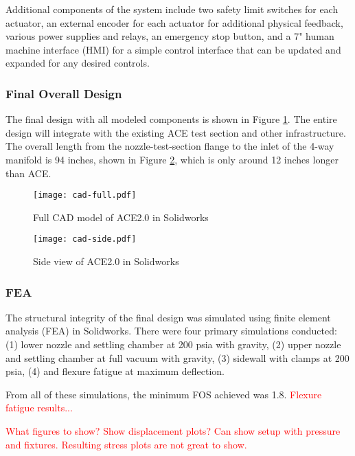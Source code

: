Additional components of the system include two safety limit switches for each actuator, an external encoder for each actuator for additional physical feedback, various power supplies and relays, an emergency stop button, and a 7" human machine interface (HMI) for a simple control interface that can be updated and expanded for any desired controls.

\subsubsection{Final Overall Design}

The final design with all modeled components is shown in Figure \ref{fig:cad-full}. The entire design will integrate with the existing ACE test section and other infrastructure. The overall length from the nozzle-test-section flange to the inlet of the 4-way manifold is 94 inches, shown in Figure \ref{fig:cad-side}, which is only around 12 inches longer than ACE.

\begin{figure}[ht!]
    \centering
    \texttt{[image: cad-full.pdf]}
    \caption{Full CAD model of ACE2.0 in Solidworks}
    \label{fig:cad-full}
\end{figure}

\begin{figure}[ht!]
    \centering
    \texttt{[image: cad-side.pdf]}
    \caption{Side view of ACE2.0 in Solidworks}
    \label{fig:cad-side}
\end{figure}

\subsubsection{FEA}

The structural integrity of the final design was simulated using finite element analysis (FEA) in Solidworks. There were four primary simulations conducted: (1) lower nozzle and settling chamber at 200 psia with gravity, (2) upper nozzle and settling chamber at full vacuum with gravity, (3) sidewall with clamps at 200 psia, (4) and flexure fatigue at maximum deflection.

From all of these simulations, the minimum FOS achieved was 1.8. \textcolor{red}{Flexure fatigue results...} 

\textcolor{red}{What figures to show? Show displacement plots? Can show setup with pressure and fixtures. Resulting stress plots are not great to show.}

